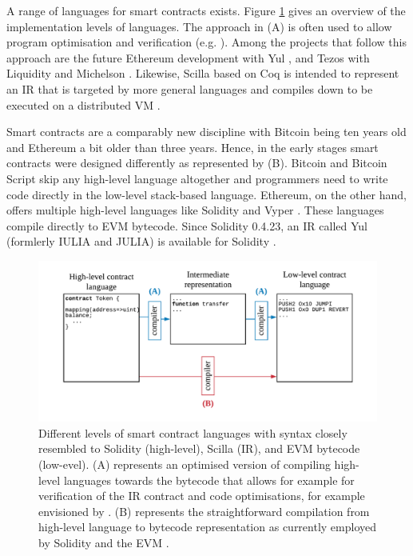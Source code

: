 \documentclass{llncs}
\begin{document}
A range of languages for smart contracts exists. Figure \ref{fig:lang} gives an overview of the implementation levels of languages.
The approach in (A) is often used to allow program optimisation and verification (e.g. \cite{Lattner2004}). 
Among the projects that follow this approach are the future Ethereum development with Yul \cite{EthereumFoundation2018IULIA}, and Tezos with Liquidity \cite{OCamlProSAS2018} and Michelson \cite{DynamicLedgerSolutions2017}.
Likewise, Scilla based on Coq is intended to represent an IR that is targeted by more general languages and compiles down to be executed on a distributed VM \cite{Sergey2018}.

Smart contracts are a comparably new discipline with Bitcoin being ten years old and Ethereum a bit older than three years.
Hence, in the early stages smart contracts were designed differently as represented by (B).
Bitcoin and Bitcoin Script \cite{BitcoinWiki2018Script} skip any high-level language altogether and programmers need to write code directly in the low-level stack-based language.
Ethereum, on the other hand, offers multiple high-level languages like Solidity \cite{Ethereum2018Solidity} and Vyper \cite{Ethereum2018Vyper}.
These languages compile directly to EVM bytecode. 
Since Solidity 0.4.23, an IR called Yul (formlerly IULIA and JULIA) is available for Solidity \cite{EthereumFoundation2018IULIA}.

\begin{figure}
\label{fig:lang}
\includegraphics[width=\textwidth]{fig/Language.pdf}
\caption{Different levels of smart contract languages with syntax closely resembled to Solidity (high-level), Scilla (IR), and EVM bytecode (low-evel). (A) represents an optimised version of compiling high-level languages towards the bytecode that allows for example for verification of the IR contract and code optimisations, for example envisioned by \cite{Sergey2018,OCamlProSAS2018}. (B) represents the straightforward compilation from high-level language to bytecode representation as currently employed by Solidity and the EVM \cite{Ethereum2018Solidity,Wood2014}.}
\end{figure}
\end{document}

